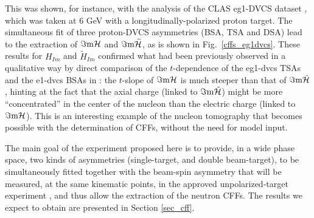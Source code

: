 This was shown, for instance, with the analysis of the CLAS eg1-DVCS dataset \cite{pisano}, which was taken at 6 GeV with a longitudinally-polarized proton target. The simultaneous fit of three proton-DVCS asymmetries (BSA, TSA and DSA) lead to the extraction of $\Im{\rm m}{\cal H}$ and $\Im{\rm m}{\cal {\widetilde{H}}}$, as is shown in Fig.~\ref{cffs_eg1dvcs}. These results for $H_{Im}$ and ${\tilde{H}}_{Im}$ confirmed what had been previously observed in a qualitative way by direct comparison of the $t$-dependence of the eg1-dvcs TSAs and the e1-dvcs BSAs in \cite{erin}: the $t$-slope of $\Im{\rm m}{\cal H}$ is much steeper than that of $\Im{\rm m}{\tilde{\cal H}}$, hinting at the fact that the axial charge (linked to $\Im{\rm m}{\tilde{\cal H}}$) might be more ``concentrated'' in the center of the nucleon than the electric charge (linked to $\Im{\rm m}{\cal H}$). This is an interesting example of the nucleon tomography that becomes possible with the determination of CFFs, without the need for model input. 

The main goal of the experiment proposed here is to provide, in a wide phase space, two kinds of asymmetries (single-target, and double beam-target), to be simultaneously fitted together with the beam-spin asymmetry that will be measured, at the same kinematic points, in the approved unpolarized-target experiment \cite{proposal}, and thus allow the extraction of the neutron CFFs. The results we expect to obtain are presented in Section \ref{sec_cff}. 

